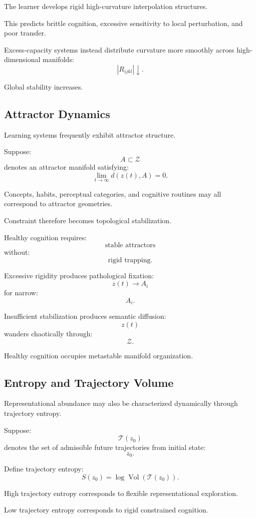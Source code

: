 \documentclass[12pt,a4paper]{article}
\begin{document}
The learner develops rigid high-curvature interpolation structures.

This predicts brittle cognition, excessive sensitivity to local perturbation, and poor transfer.

Excess-capacity systems instead distribute curvature more smoothly across high-dimensional manifolds:
\[
|R_{ijkl}|
\downarrow.
\]

Global stability increases.

\subsection{Attractor Dynamics}

Learning systems frequently exhibit attractor structure.

Suppose:
\[
A
\subset
\mathcal{Z}
\]
denotes an attractor manifold satisfying:
\[
\lim_{t\to\infty}
d(z(t),A)
=
0.
\]

Concepts, habits, perceptual categories, and cognitive routines may all correspond to attractor geometries.

Constraint therefore becomes topological stabilization.

Healthy cognition requires:
\[
\text{stable attractors}
\]
without:
\[
\text{rigid trapping}.
\]

Excessive rigidity produces pathological fixation:
\[
z(t)
\rightarrow
A_i
\]
for narrow:
\[
A_i.
\]

Insufficient stabilization produces semantic diffusion:
\[
z(t)
\]
wanders chaotically through:
\[
\mathcal{Z}.
\]

Healthy cognition occupies metastable manifold organization.

\subsection{Entropy and Trajectory Volume}

Representational abundance may also be characterized dynamically through trajectory entropy.

Suppose:
\[
\mathcal{T}(z_0)
\]
denotes the set of admissible future trajectories from initial state:
\[
z_0.
\]

Define trajectory entropy:
\[
S(z_0)
=
\log
\operatorname{Vol}
(
\mathcal{T}(z_0)
).
\]

High trajectory entropy corresponds to flexible representational exploration.

Low trajectory entropy corresponds to rigid constrained cognition.
\end{document}
